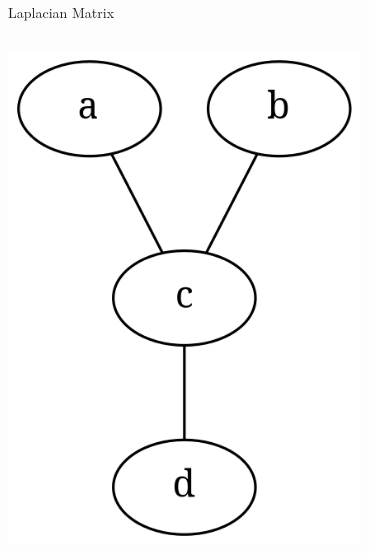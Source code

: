 \documentclass[aspectratio=169,xcolor=dvipsnames]{beamer}
\begin{document}
\begin{frame}{Laplacian Matrix}
\begin{columns}

\begin{column}{0.4\textwidth}
\centering
\includegraphics[width=0.7\textwidth]{graph-simple}
\end{column}


\end{columns}
\end{frame}
\end{document}
